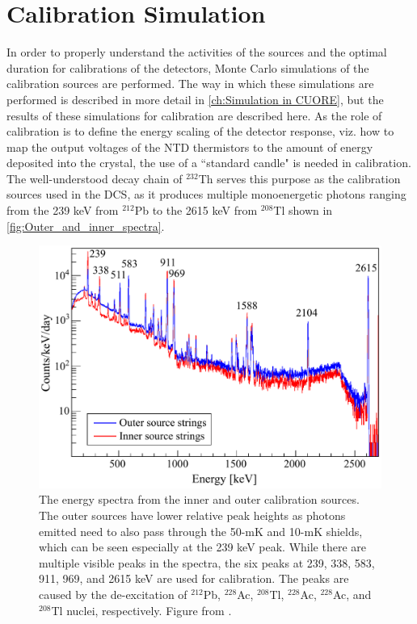 \section{Calibration Simulation}
In order to properly understand the activities of the sources and the optimal duration for calibrations of the detectors, Monte Carlo simulations of the calibration sources are performed.
The way in which these simulations are performed is described in more detail in \autoref{ch:Simulation in CUORE}, but the results of these simulations for calibration are described here.
As the role of calibration is to define the energy scaling of the detector response, viz. how to map the output voltages of the NTD thermistors to the amount of energy deposited into the crystal, the use of a ``standard candle" is needed in calibration.
The well-understood decay chain of $^{232}$Th serves this purpose as the calibration sources used in the DCS, as it produces multiple monoenergetic photons ranging from the 239 keV from $^{212}$Pb to the 2615 keV from $^{208}$Tl shown in \autoref{fig:Outer_and_inner_spectra}.
\begin{figure}[htbp]
    \centering
    \includegraphics[width=0.9\linewidth]{Figures/overlapping_spectra.pdf}
    \caption[The energy spectra from the inner and outer calibration sources]
    {The energy spectra from the inner and outer calibration sources.
    The outer sources have lower relative peak heights as photons emitted need to also pass through the 50-mK and 10-mK shields, which can be seen especially at the 239 keV peak. 
    While there are multiple visible peaks in the spectra, the six peaks at 239, 338, 583, 911, 969, and 2615 keV are used for calibration.
    The peaks are caused by the de-excitation of $^{212}$Pb, $^{228}$Ac, $^{208}$Tl, $^{228}$Ac, $^{228}$Ac, and $^{208}$Tl nuclei, respectively.
    Figure from \cite{Cushman:2016cnv}.}
    \label{fig:Outer_and_inner_spectra}
\end{figure}
